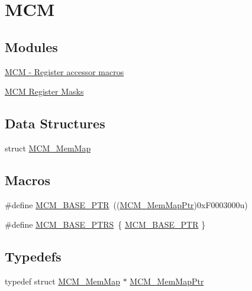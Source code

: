 \hypertarget{group___m_c_m___peripheral}{}\section{M\+C\+M}
\label{group___m_c_m___peripheral}
\subsection*{Modules}
\begin{DoxyCompactItemize}
\item 
\hyperlink{group___m_c_m___register___accessor___macros}{M\+C\+M -\/ Register accessor macros}
\item 
\hyperlink{group___m_c_m___register___masks}{M\+C\+M Register Masks}
\end{DoxyCompactItemize}
\subsection*{Data Structures}
\begin{DoxyCompactItemize}
\item 
struct \hyperlink{struct_m_c_m___mem_map}{M\+C\+M\+\_\+\+Mem\+Map}
\end{DoxyCompactItemize}
\subsection*{Macros}
\begin{DoxyCompactItemize}
\item 
\#define \hyperlink{group___m_c_m___peripheral_gad41e931f176c230831e3dbad45117841}{M\+C\+M\+\_\+\+B\+A\+S\+E\+\_\+\+P\+T\+R}~((\hyperlink{group___m_c_m___peripheral_ga72e8bbe428d9410917903164d3a5f675}{M\+C\+M\+\_\+\+Mem\+Map\+Ptr})0x\+F0003000u)
\item 
\#define \hyperlink{group___m_c_m___peripheral_gae2d5e838ce7d2d4108738c05bf224272}{M\+C\+M\+\_\+\+B\+A\+S\+E\+\_\+\+P\+T\+R\+S}~\{ \hyperlink{group___m_c_m___peripheral_gad41e931f176c230831e3dbad45117841}{M\+C\+M\+\_\+\+B\+A\+S\+E\+\_\+\+P\+T\+R} \}
\end{DoxyCompactItemize}
\subsection*{Typedefs}
\begin{DoxyCompactItemize}
\item 
typedef struct \hyperlink{struct_m_c_m___mem_map}{M\+C\+M\+\_\+\+Mem\+Map} $\ast$ \hyperlink{group___m_c_m___peripheral_ga72e8bbe428d9410917903164d3a5f675}{M\+C\+M\+\_\+\+Mem\+Map\+Ptr}
\end{DoxyCompactItemize}



